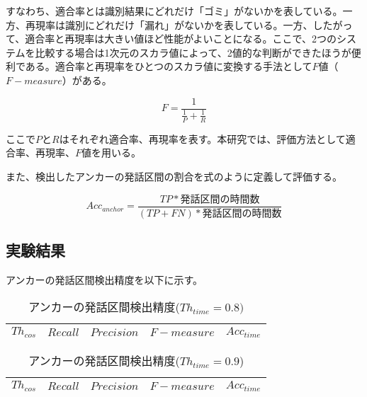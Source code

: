 すなわち、適合率とは識別結果にどれだけ「ゴミ」がないかを表している。一方、再現率は識別にどれだけ「漏れ」がないかを表している。一方、したがって、適合率と再現率は大きい値ほど性能がよいことになる。ここで、2つのシステムを比較する場合は1次元のスカラ値によって、2値的な判断ができたほうが便利である。適合率と再現率をひとつのスカラ値に変換する手法として$F$値（$F-measure$）がある。

\begin{equation}
\label{calc:fmeasure}
F = \frac{1}{\frac{1}{P} + \frac{1}{R}}
\end{equation}

ここで$P$と$R$はそれぞれ適合率、再現率を表す。本研究では、評価方法として適合率、再現率、$F$値を用いる。

また、検出したアンカーの発話区間の割合を式のように定義して評価する。

\begin{equation}
\label{calc:anchor_acc}
Acc_{anchor} = \frac{TP * 発話区間の時間数}{(TP + FN) * 発話区間の時間数}
\end{equation}

\subsection{実験結果}
アンカーの発話区間検出精度を以下に示す。

\begin{table}[H]
  \begin{center}
    \caption{アンカーの発話区間検出精度($Th_{time}=0.8)$ \label{table:result_get_anchor08}}
    \begin{tabular}{|c||c|c|c|c|} \hline
      $Th_{cos}$ & $Recall$ & $Precision$ & $F-measure$ & $Acc_{time}$\\ \hline


    \end{tabular}
  \end{center}
\end{table}

\begin{table}[H]
  \begin{center}
    \caption{アンカーの発話区間検出精度($Th_{time}=0.9$) \label{table:result_get_anchor09}}
    \begin{tabular}{|c||c|c|c|c|} \hline
      $Th_{cos}$ & $Recall$ & $Precision$ & $F-measure$ & $Acc_{time}$\\ \hline


    \end{tabular}
  \end{center}
\end{table}

